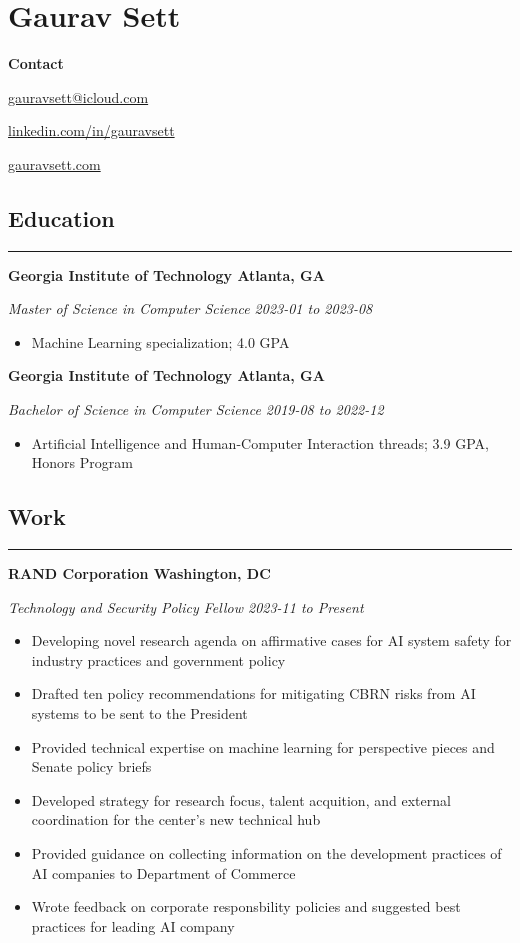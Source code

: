 \documentclass{article}
\newcommand{\headingOne}[1]{
    \subsection*{#1} \hrule
    \vspace*{6pt}
}
\newcommand{\headingTwo}[2]{
    \vspace*{6pt}
    \textbf{#1 \hfill #2}
}
\newcommand{\headingThree}[2]{
    \vspace*{2pt}
    \textsl{#1 \hfill #2}
}
\begin{document}
\section*{Gaurav Sett}

\textbf{Contact}
\begin{itemize*}[label=$|$]
    \item \href{mailto:gauravsett@icloud.com}{gauravsett@icloud.com}
    \item \href{https://linkedin.com/in/gauravsett}{linkedin.com/in/gauravsett}
    \item \href{https://gauravsett.com}{gauravsett.com}
\end{itemize*}



\headingOne{Education}


\headingTwo{Georgia Institute of Technology}{Atlanta, GA}

\headingThree{Master of Science in Computer Science}{2023-01 to 2023-08}
\begin{itemize}
    \item Machine Learning specialization; 4.0 GPA
\end{itemize}


\headingTwo{Georgia Institute of Technology}{Atlanta, GA}

\headingThree{Bachelor of Science in Computer Science}{2019-08 to 2022-12}
\begin{itemize}
    \item Artificial Intelligence and Human-Computer Interaction threads; 3.9 GPA, Honors Program
\end{itemize}



\headingOne{Work}


\headingTwo{RAND Corporation}{Washington, DC}

\headingThree{Technology and Security Policy Fellow}{2023-11 to Present}
\begin{itemize}
    \item Developing novel research agenda on affirmative cases for AI system safety for industry practices and government policy
    \item Drafted ten policy recommendations for mitigating CBRN risks from AI systems to be sent to the President
    \item Provided technical expertise on machine learning for perspective pieces and Senate policy briefs
    \item Developed strategy for research focus, talent acquition, and external coordination for the center's new technical hub
    \item Provided guidance on collecting information on the development practices of AI companies to Department of Commerce
    \item Wrote feedback on corporate responsbility policies and suggested best practices for leading AI company
\end{itemize}
\end{document}
